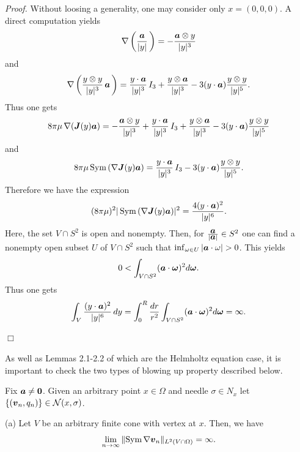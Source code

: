 {\it\noindent Proof.}
Without loosing a generality, one may consider only $x=(0,0,0)$.
A direct computation yields
$$\displaystyle
\nabla\left(\frac{\mbox{\boldmath $a$}}{\vert y\vert}\,\right)=-\frac{\mbox{\boldmath $a$}\otimes y}{\vert y\vert^3}
$$
and
$$
\displaystyle
\nabla\left(\frac{y\otimes y}{\vert y\vert^3}\,\mbox{\boldmath $a$}\,\right)
=\frac{y\cdot\mbox{\boldmath $a$}}{\vert y\vert^3}\,I_3+\frac{y\otimes\mbox{\boldmath $a$}}{\vert y\vert^3}
-3(y\cdot\mbox{\boldmath $a$})\frac{y\otimes y}{\vert y\vert^5}.
$$
Thus one gets
$$\displaystyle
8\pi\mu\,\nabla(\mbox{\boldmath $J$}(y)\mbox{\boldmath $a$})
=-\frac{\mbox{\boldmath $a$}\otimes y}{\vert y\vert^3}+\frac{y\cdot\mbox{\boldmath $a$}}{\vert y\vert^3}\,I_3+\frac{y\otimes\mbox{\boldmath $a$}}{\vert y\vert^3}
-3(y\cdot\mbox{\boldmath $a$})\frac{y\otimes y}{\vert y\vert^5}
$$
and 
$$\displaystyle
8\pi\mu\,\text{Sym}\,(\nabla\mbox{\boldmath $J$}(y)\mbox{\boldmath $a$})
=\frac{y\cdot\mbox{\boldmath $a$}}{\vert y\vert^3}\,I_3-3(y\cdot\mbox{\boldmath $a$})\frac{y\otimes y}{\vert y\vert^5}.
$$
Therefore we have the expression
$$\displaystyle
(8\pi\mu)^2\vert\,\text{Sym}\,(\nabla\mbox{\boldmath $J$}(y)\mbox{\boldmath $a$})\vert^2
=\frac{4(y\cdot\mbox{\boldmath $a$})^2}{\vert y\vert^6}.
$$
Here, the set $V\cap S^2$ is open and nonempty. Then, for $\frac{\mbox{\boldmath $a$}}{\vert\mbox{\boldmath $a$}\vert}\in S^2$ one can find
a nonempty open subset $U$ of  $V\cap S^2$ such that $\inf_{\omega\in U}\vert\mbox{\boldmath $a$}\cdot\omega\vert>0$.
This yields
$$\displaystyle
0<\int_{V\cap S^2}(\mbox{\boldmath $a$}\cdot\mbox{\boldmath $\omega$})^2 d\mbox{\boldmath $\omega$}.
$$
Thus one gets
$$\displaystyle
\int_{V}\frac{(y\cdot\mbox{\boldmath $a$})^2}{\vert y\vert^6}\,dy
=\int_{0}^{R}\frac{dr}{r^2}\int_{V\cap S^2}(\mbox{\boldmath $a$}\cdot\mbox{\boldmath $\omega$})^2 d\mbox{\boldmath $\omega$}
=\infty.
$$

\noindent
$\Box$


As well as Lemmas 2.1-2.2 of \cite{INew} which are the Helmholtz equation case, 
it is important to check the two types of blowing up property described below.



  Fix $\mbox{\boldmath $a$}\not=\mbox{\boldmath $0$}$.
Given an arbitrary point $x\in\Omega$ and needle $\sigma\in N_x$ let $\{(\mbox{\boldmath $v$}_n, q_n)\}\in {\cal N}(x,\sigma)$.



\noindent
(a)  Let $V$ be an arbitrary finite cone with vertex at $x$.  Then, we have
$$\displaystyle
\lim_{n\rightarrow\infty}\Vert \text{Sym}\,\nabla\mbox{\boldmath $v$}_n\Vert_{L^2(V\cap\Omega)}=\infty.
$$


